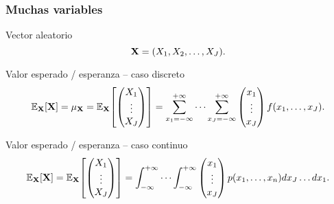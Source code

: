 \documentclass[table]{beamer}
\begin{document}
\iffalse
\begin{frame}
    \frametitle{Muchas variables}
    \begin{block}{Vector aleatorio}
        \begin{equation*}
            \Xvec = \parens{X_{1}, X_{2}, \ldots , X_{J}} .
        \end{equation*}
    \end{block}
    \begin{block}{Valor esperado / esperanza -- caso discreto}
        \begin{equation*}
            \expecteddist{\Xvec}{\Xvec} = \mu_{\Xvec} = \expecteddist{\Xvec}{\begin{pmatrix} X_{1} \\ \vdots \\ X_{J} \end{pmatrix}} = \sum_{x_{1} = - \infty}^{+ \infty} \cdots \sum_{x_{J} = - \infty}^{+ \infty} \begin{pmatrix} x_{1} \\ \vdots \\ x_{J} \end{pmatrix} \ff{x_{1}, \ldots, x_{J}} .
        \end{equation*}
    \end{block}
    \begin{block}{Valor esperado / esperanza -- caso continuo}
        \begin{equation*}
            \expecteddist{\Xvec}{\Xvec} = \expecteddist{\Xvec}{\begin{pmatrix} X_{1} \\ \vdots \\ X_{J} \end{pmatrix}} = \int_{- \infty}^{+ \infty} \cdots \int_{- \infty}^{+ \infty} \begin{pmatrix} x_{1} \\ \vdots \\ x_{J} \end{pmatrix} \pdf{x_{1}, \ldots, x_{n}} d x_{J} \ldots d x_{1} .
        \end{equation*}
    \end{block}
\end{frame}
\end{document}
